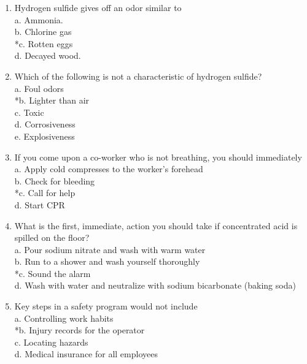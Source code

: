 \begin{enumerate}
\item Hydrogen sulfide gives off an odor similar to \\

a. Ammonia. \\
b. Chlorine gas \\
*c. Rotten eggs \\
d. Decayed wood. \\

\item Which of the following is not a characteristic of hydrogen sulfide? \\

a. Foul odors \\
*b. Lighter than air \\
c. Toxic \\
d. Corrosiveness \\
e. Explosiveness \\

\item If you come upon a co-worker who is not breathing, you should immediately \\

a. Apply cold compresses to the worker's forehead \\
b. Check for bleeding \\
*c. Call for help \\
d. Start CPR \\

\item What is the first, immediate, action you should take if concentrated acid is spilled on the floor? \\

a. Pour sodium nitrate and wash with warm water \\
b. Run to a shower and wash yourself thoroughly \\
*c. Sound the alarm \\
d. Wash with water and neutralize with sodium bicarbonate (baking soda) \\

\item Key steps in a safety program would not include \\

a. Controlling work habits \\
*b. Injury records for the operator \\
c. Locating hazards \\
d. Medical insurance for all employees \\


\end{enumerate}
